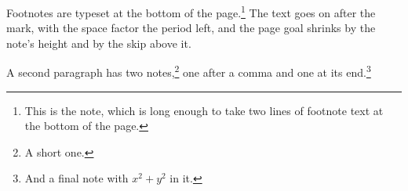 \documentclass{article}
\begin{document}
Footnotes are typeset at the bottom of the page.\footnote{This is the note, which is long enough to take two lines of footnote text at the bottom of the page.} The text goes on after the mark, with the space factor the period left, and the page goal shrinks by the note's height and by the skip above it.

A second paragraph has two notes,\footnote{A short one.} one after a comma and one at its end.\footnote{And a final note with $x^2+y^2$ in it.}
\end{document}
